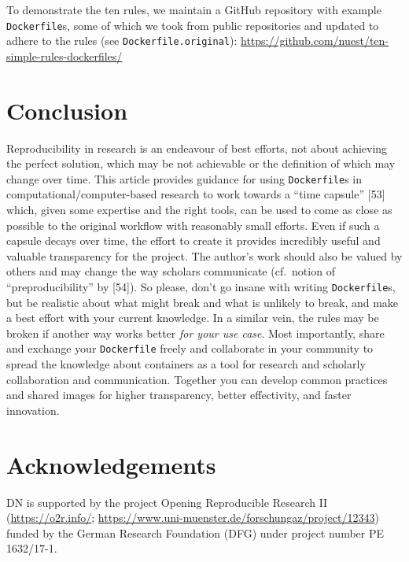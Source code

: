 \documentclass[10pt,letterpaper]{article}
\begin{document}
To demonstrate the ten rules, we maintain a GitHub repository with
example \texttt{Dockerfile}s, some of which we took from public
repositories and updated to adhere to the rules (see
\texttt{Dockerfile.original}):
\url{https://github.com/nuest/ten-simple-rules-dockerfiles/}

\hypertarget{conclusion}{%
\section*{Conclusion}\label{conclusion}}

Reproducibility in research is an endeavour of best efforts, not about
achieving the perfect solution, which may be not achievable or the
definition of which may change over time. This article provides guidance
for using \texttt{Dockerfile}s in computational/computer-based research
to work towards a ``time capsule'' {[}53{]} which, given some expertise
and the right tools, can be used to come as close as possible to the
original workflow with reasonably small efforts. Even if such a capsule
decays over time, the effort to create it provides incredibly useful and
valuable transparency for the project. The author's work should also be
valued by others and may change the way scholars communicate (cf.~notion
of ``preproducibility'' by {[}54{]}). So please, don't go insane with
writing \texttt{Dockerfile}s, but be realistic about what might break
and what is unlikely to break, and make a best effort with your current
knowledge. In a similar vein, the rules may be broken if another way
works better \emph{for your use case}. Most importantly, share and
exchange your \texttt{Dockerfile} freely and collaborate in your
community to spread the knowledge about containers as a tool for
research and scholarly collaboration and communication. Together you can
develop common practices and shared images for higher transparency,
better effectivity, and faster innovation.

\hypertarget{acknowledgements}{%
\section*{Acknowledgements}\label{acknowledgements}}

DN is supported by the project Opening Reproducible Research II
(\href{https://o2r.info/}{https://o2r.info/};
\href{https://www.uni-muenster.de/forschungaz/project/12343}{https://www.uni-muenster.de/forschungaz/project/12343})
funded by the German Research Foundation (DFG) under project number PE
1632/17-1.
\end{document}
